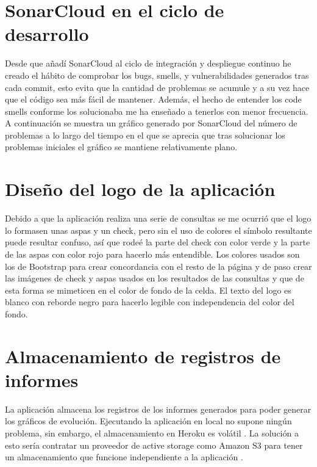 \section{SonarCloud en el ciclo de desarrollo}
Desde que añadí SonarCloud al ciclo de integración y despliegue continuo he creado el hábito de comprobar los bugs, smells, y vulnerabilidades generados tras cada commit, esto evita que la cantidad de problemas se acumule y a su vez hace que el código sea más fácil de mantener. Además, el hecho de entender los code smells conforme los solucionaba me ha enseñado a tenerlos con menor frecuencia. A continuación se muestra un gráfico generado por SonarCloud del número de problemas a lo largo del tiempo en el que se aprecia que tras solucionar los problemas iniciales el gráfico se mantiene relativamente plano. 

\section{Diseño del logo de la aplicación}
Debido a que la aplicación realiza una serie de consultas se me ocurrió que el logo lo formasen unas aspas y un check, pero sin el uso de colores el símbolo resultante puede resultar confuso, así que rodeé la parte del check con color verde y la parte de las aspas con color rojo para hacerlo más entendible.
Los colores usados son los de Bootstrap para crear concordancia con el resto de la página y de paso crear las imágenes de check y aspas usados en los resultados de las consultas y que de esta forma se mimeticen en el color de fondo de la celda. El texto del logo es blanco con reborde negro para hacerlo legible con independencia del color del fondo. 

\section{Almacenamiento de registros de informes}
La aplicación almacena los registros de los informes generados para poder generar los gráficos de evolución. Ejecutando la aplicación en local no supone ningún problema, sin embargo, el almacenamiento en Heroku es volátil \cite{ephemeralHeroku-2018}. La solución a esto sería contratar un proveedor de active storage como Amazon S3 para tener un almacenamiento que funcione independiente a la aplicación \cite{activeStorageOverview-2019}.

